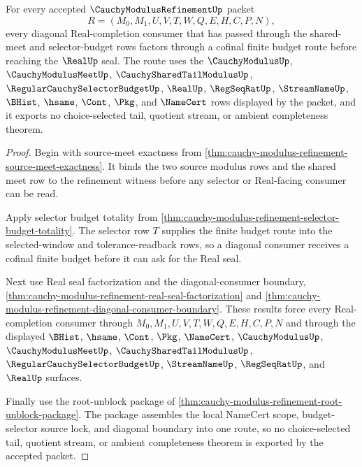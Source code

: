 \begin{theorem}
\label{thm:cauchy-modulus-refinement-diagonal-budget-cofinality}
For every accepted $\CauchyModulusRefinementUp$ packet
$$
R=(M_0,M_1,U,V,T,W,Q,E,H,C,P,N),
$$
every diagonal Real-completion consumer that has passed through the shared-meet and selector-budget rows factors through a cofinal finite budget route before reaching the $\RealUp$ seal. The route uses the $\CauchyModulusUp$, $\CauchyModulusMeetUp$, $\CauchySharedTailModulusUp$, $\RegularCauchySelectorBudgetUp$, $\RealUp$, $\RegSeqRatUp$, $\StreamNameUp$, $\BHist$, $\hsame$, $\Cont$, $\Pkg$, and $\NameCert$ rows displayed by the packet, and it exports no choice-selected tail, quotient stream, or ambient completeness theorem.
\end{theorem}
\begin{proof}
Begin with source-meet exactness from \autoref{thm:cauchy-modulus-refinement-source-meet-exactness}. It binds the two source modulus rows and the shared meet row to the refinement witness before any selector or Real-facing consumer can be read.

Apply selector budget totality from \autoref{thm:cauchy-modulus-refinement-selector-budget-totality}. The selector row $T$ supplies the finite budget route into the selected-window and tolerance-readback rows, so a diagonal consumer receives a cofinal finite budget before it can ask for the Real seal.

Next use Real seal factorization and the diagonal-consumer boundary, \autoref{thm:cauchy-modulus-refinement-real-seal-factorization} and \autoref{thm:cauchy-modulus-refinement-diagonal-consumer-boundary}. These results force every Real-completion consumer through $M_0,M_1,U,V,T,W,Q,E,H,C,P,N$ and through the displayed $\BHist$, $\hsame$, $\Cont$, $\Pkg$, $\NameCert$, $\CauchyModulusUp$, $\CauchyModulusMeetUp$, $\CauchySharedTailModulusUp$, $\RegularCauchySelectorBudgetUp$, $\StreamNameUp$, $\RegSeqRatUp$, and $\RealUp$ surfaces.

Finally use the root-unblock package of \autoref{thm:cauchy-modulus-refinement-root-unblock-package}. The package assembles the local NameCert scope, budget-selector source lock, and diagonal boundary into one route, so no choice-selected tail, quotient stream, or ambient completeness theorem is exported by the accepted packet.
\end{proof}

